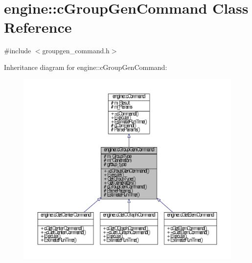 \hypertarget{classengine_1_1cGroupGenCommand}{\section{engine\-:\-:c\-Group\-Gen\-Command \-Class \-Reference}
\label{classengine_1_1cGroupGenCommand}
}


{\ttfamily \#include $<$groupgen\-\_\-command.\-h$>$}



\-Inheritance diagram for engine\-:\-:c\-Group\-Gen\-Command\-:\nopagebreak
\begin{figure}[H]
\begin{center}
\leavevmode
\includegraphics[width=350pt]{classengine_1_1cGroupGenCommand__inherit__graph}
\end{center}
\end{figure}



